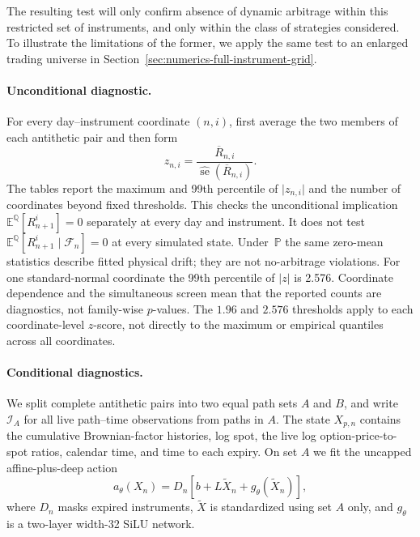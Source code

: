 \documentclass[11pt]{article}
\newcommand{\E}{\mathbb E}
\newcommand{\Q}{\mathbb Q}
\newcommand{\PP}{\mathbb P}
\newcommand{\abs}[1]{\lvert #1\rvert}
\theoremstyle{plain}
\theoremstyle{definition}
\theoremstyle{remark}
\begin{document}
The resulting test will only confirm absence of dynamic arbitrage within this restricted set of instruments, 
and only within the class of strategies considered. To illustrate the limitations of the former,
we apply the same test to an enlarged trading universe
in Section~\ref{sec:numerics-full-instrument-grid}.

\paragraph{Unconditional diagnostic.}
For every day--instrument coordinate $(n,i)$, first average the two members of
each antithetic pair and then form
\begin{equation}\label{eq:numerics-z-score}
  z_{n,i}
  =\frac{\overline R_{n,i}}
  {\widehat{\operatorname{se}}(\overline R_{n,i})}.
\end{equation}
The tables report the maximum and 99th percentile of $\abs{z_{n,i}}$ and the
number of coordinates beyond fixed thresholds.  This checks the unconditional
implication $\E^\Q[R_{n+1}^i]=0$ separately at every day and instrument.  It
does not test $\E^\Q[R_{n+1}^i\mid\mathcal F_n]=0$ at every simulated state.
Under~$\PP$ the same zero-mean statistics describe fitted physical drift; they
are not no-arbitrage violations.  For one standard-normal coordinate the 99th
percentile of $\abs{z}$ is 2.576.  Coordinate dependence and the simultaneous
screen mean that the reported counts are diagnostics, not family-wise
$p$-values.  The $1.96$ and $2.576$ thresholds apply to each coordinate-level
$z$-score, not directly to the maximum or empirical quantiles across all
coordinates.

\paragraph{Conditional diagnostics.}
We split complete antithetic pairs into two equal path sets $A$ and $B$, and
write $\mathcal I_A$ for all live path--time observations from paths in $A$.
The state $X_{p,n}$ contains the cumulative Brownian-factor histories, log
spot, the live log option-price-to-spot ratios, calendar time, and time to each
expiry.  On set $A$ we fit the uncapped affine-plus-deep action
\begin{equation}\label{eq:numerics-action-map}
  a_\theta(X_n)
  =D_n\left[b+L\widetilde X_n+g_\theta(\widetilde X_n)\right],
\end{equation}
where $D_n$ masks expired instruments, $\widetilde X$ is standardized using
set $A$ only, and $g_\theta$ is a two-layer width-32 SiLU network.
\end{document}
